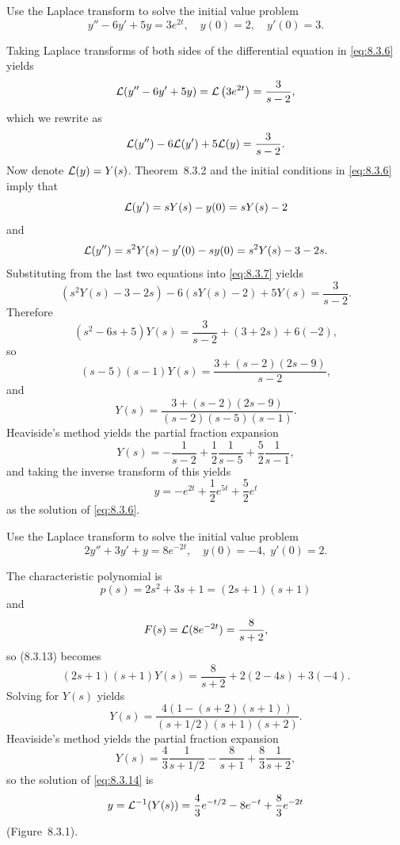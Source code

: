 \setcounter{example}{1}
\setcounter{equation}{5}
\begin{example}
  \label{example:8.3.2}\rm Use the Laplace transform to solve the initial value problem
  \begin{equation}
    \label{eq:8.3.6}y''-6y'+5y=3e^{2t},\quad y(0)=2,\quad y'(0)=3.
  \end{equation}
\end{example}
\setcounter{equation}{6}
\begin{examplesolution}
\solution Taking Laplace transforms of both sides of the differential equation in \eqref{eq:8.3.6}
yields
\[
  {\cal L}(y''-6y'+5y)={\cal L}\left(3e^{2t}\right)=\frac{3}{s-2},
\]
which we rewrite as
\begin{equation}
  \label{eq:8.3.7}{\cal L}(y'')-6{\cal L}(y')+5{\cal L}(y)=\frac{3}{s-2}.
\end{equation}
Now denote ${\cal L}(y)=Y(s)$. Theorem~8.3.2 and the initial conditions in
\eqref{eq:8.3.6} imply that
\[
  {\cal L}(y')=sY(s)-y(0)=sY(s)-2
\]
and
\[
  {\cal L}(y'')=s^{2}Y(s)-y'(0)-sy(0)=s^{2}Y(s)-3-2s.
\]
Substituting from the last two equations into \eqref{eq:8.3.7} yields
\[
  \left(s^{2}Y(s)-3-2s\right)-6\left(sY(s)-2\right)+5Y(s)=\frac{3}{s-2}.
\]
Therefore
\begin{equation}
  \label{eq:8.3.8}(s^{2}-6s+5)Y(s)=\frac{3}{s-2}+(3+2s)+6(-2),
\end{equation}
so
\[
  (s-5)(s-1)Y(s)=\frac{3+(s-2)(2s-9)}{s-2},
\]
and
\[
  Y(s)=\frac{3+(s-2)(2s-9)}{(s-2)(s-5)(s-1)}.
\]
Heaviside's method yields the partial fraction expansion
\[
  Y(s)=-\frac{1}{s-2}+\frac{1}{2}\frac{1}{s-5}+\frac{5}{2}\frac{1}{s-1},
\]
and taking the inverse transform of this yields
\[
  y=-e^{2t}+\frac{1}{2}e^{5t}+\frac{5}{2}e^{t}
\]
as the solution of \eqref{eq:8.3.6}.\bbox
\end{examplesolution}

\setcounter{example}{2}
\setcounter{equation}{13}
\begin{example}
  \label{example:8.3.3}\rm Use the Laplace transform to solve the initial value problem
  \begin{equation}
    \label{eq:8.3.14}2y''+3y'+y=8e^{-2t},\quad y(0)=-4,\;y'(0)=2.
  \end{equation}
\end{example}
\begin{examplesolution}
\solution The characteristic polynomial is
\[
  p(s)=2s^{2}+3s+1=(2s+1)(s+1)
\]
and
\[
  F(s)={\cal L}(8e^{-2t})=\frac{8}{s+2},
\]
so \textup{(8.3.13)} becomes
\[
  (2s+1)(s+1)Y(s)=\frac{8}{s+2}+2(2-4s)+3(-4).
\]
Solving for $Y(s)$ yields
\[
  Y(s)=\frac{4\left(1-(s+2)(s+1)\right)}{(s+1/2)(s+1)(s+2)}.
\]
Heaviside's method yields the partial fraction expansion
\[
  Y(s)=\frac{4}{3}\frac{1}{s+1/2}-\frac{8}{s+1}+\frac{8}{3}\frac{1}{s+2},
\]
so the solution of \eqref{eq:8.3.14} is
\[
  y={\cal L}^{-1}(Y(s))=\frac{4}{3}e^{-t/2}-8e^{-t}+\frac{8}{3}e^{-2t}
\]
(Figure~8.3.1).
\end{examplesolution}

